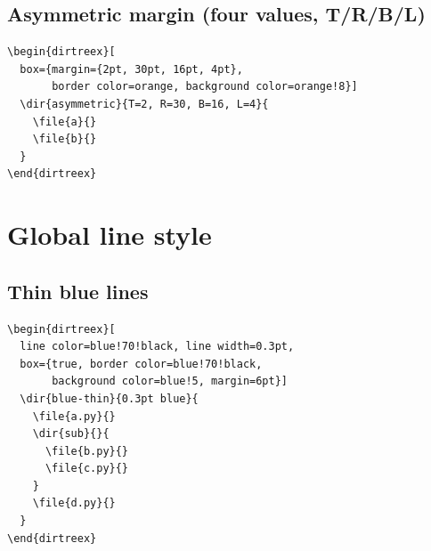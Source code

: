 \documentclass[11pt]{article}
\begin{document}
\begin{dirtreex}[
  box={margin=18pt, border color=black,
       background color=gray!5}]
\end{dirtreex}

\subsection{Asymmetric margin (four values, T/R/B/L)}

\begin{Verbatim}
\begin{dirtreex}[
  box={margin={2pt, 30pt, 16pt, 4pt},
       border color=orange, background color=orange!8}]
  \dir{asymmetric}{T=2, R=30, B=16, L=4}{
    \file{a}{}
    \file{b}{}
  }
\end{dirtreex}
\end{Verbatim}

\begin{dirtreex}[
  box={margin={2pt, 30pt, 16pt, 4pt},
       border color=orange, background color=orange!8}]
\end{dirtreex}

\clearpage

\section{Global line style}

\subsection{Thin blue lines}

\begin{Verbatim}
\begin{dirtreex}[
  line color=blue!70!black, line width=0.3pt,
  box={true, border color=blue!70!black,
       background color=blue!5, margin=6pt}]
  \dir{blue-thin}{0.3pt blue}{
    \file{a.py}{}
    \dir{sub}{}{
      \file{b.py}{}
      \file{c.py}{}
    }
    \file{d.py}{}
  }
\end{dirtreex}
\end{Verbatim}

\begin{dirtreex}[
  line color=blue!70!black, line width=0.3pt,
  box={true, border color=blue!70!black,
       background color=blue!5, margin=6pt}]
\end{dirtreex}
\end{document}
